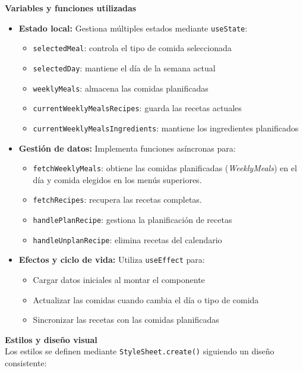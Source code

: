 \documentclass[twoside, openright, 11pt]{report}
\begin{document}
					\textbf{Variables y funciones utilizadas}
					\begin{itemize}
						\item \textbf{Estado local:} Gestiona múltiples estados mediante \texttt{useState}:
						\begin{itemize}
							\item \texttt{selectedMeal}: controla el tipo de comida seleccionada
							\item \texttt{selectedDay}: mantiene el día de la semana actual
							\item \texttt{weeklyMeals}: almacena las comidas planificadas
							\item \texttt{currentWeeklyMealsRecipes}: guarda las recetas actuales
							\item \texttt{currentWeeklyMealsIngredients}: mantiene los ingredientes planificados
						\end{itemize}
						
						\item \textbf{Gestión de datos:} Implementa funciones asíncronas para:
						\begin{itemize}
							\item \texttt{fetchWeeklyMeals}: obtiene las comidas planificadas (\textit{WeeklyMeals}) en el día y comida elegidos en los menús superiores.
							\item \texttt{fetchRecipes}: recupera las recetas completas.
							\item \texttt{handlePlanRecipe}: gestiona la planificación de recetas
							\item \texttt{handleUnplanRecipe}: elimina recetas del calendario
						\end{itemize}
						
						\item \textbf{Efectos y ciclo de vida:} Utiliza \texttt{useEffect} para:
						\begin{itemize}
							\item Cargar datos iniciales al montar el componente
							\item Actualizar las comidas cuando cambia el día o tipo de comida
							\item Sincronizar las recetas con las comidas planificadas
						\end{itemize}
					\end{itemize}
					
					\textbf{Estilos y diseño visual}\\
					Los estilos se definen mediante \texttt{StyleSheet.create()} siguiendo un diseño consistente:
					
\end{document}
